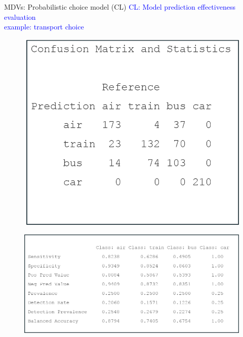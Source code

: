 \documentclass[usenames,dvipsnames]{beamer}
\begin{document}
\begin{frame}{MDVs: Probabilistic choice model (CL)}
\textcolor{Blue}{CL: Model prediction effectiveness evaluation \\ \qquad example: transport choice} \\
\bigskip
\begin{minipage}[c]{.32\textwidth}
\begin{figure}
\centering
\includegraphics[width=1.06\textwidth]{./img/P11_7}
\end{figure}
\end{minipage}%
\hspace*{3mm}
\begin{minipage}[c]{.6\textwidth}
\begin{figure}
\centering
\includegraphics[width=1.06\textwidth]{./img/P11_8}
\end{figure}
\end{minipage}
\end{frame}
\end{document}
